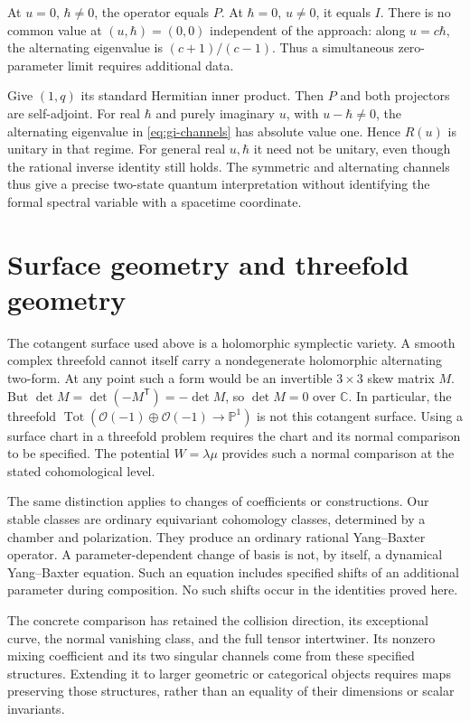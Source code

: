 At $u=0$, $\hbar\ne0$, the operator equals $P$.
At $\hbar=0$, $u\ne0$, it equals $I$.
There is no common value at $(u,\hbar)=(0,0)$ independent of the approach: along $u=c\hbar$, the alternating eigenvalue is $(c+1)/(c-1)$.
Thus a simultaneous zero-parameter limit requires additional data.

Give $(1,q)$ its standard Hermitian inner product.
Then $P$ and both projectors are self-adjoint.
For real $\hbar$ and purely imaginary $u$, with $u-\hbar\ne0$, the alternating eigenvalue in \eqref{eq:gi-channels} has absolute value one.
Hence $R(u)$ is unitary in that regime.
For general real $u,\hbar$ it need not be unitary, even though the rational inverse identity still holds.
The symmetric and alternating channels thus give a precise two-state quantum interpretation without identifying the formal spectral variable with a spacetime coordinate.

\section{Surface geometry and threefold geometry}

The cotangent surface used above is a holomorphic symplectic variety.
A smooth complex threefold cannot itself carry a nondegenerate holomorphic alternating two-form.
At any point such a form would be an invertible $3\times3$ skew matrix $M$.
But $\det M=\det(-M^{\mathsf T})=-\det M$, so $\det M=0$ over $\mathbb C$.
In particular, the threefold $\operatorname{Tot}(\mathcal O(-1)\oplus\mathcal O(-1)\to\mathbb P^1)$ is not this cotangent surface.
Using a surface chart in a threefold problem requires the chart and its normal comparison to be specified.
The potential $W=\lambda\mu$ provides such a normal comparison at the stated cohomological level.

The same distinction applies to changes of coefficients or constructions.
Our stable classes are ordinary equivariant cohomology classes, determined by a chamber and polarization.
They produce an ordinary rational Yang--Baxter operator.
A parameter-dependent change of basis is not, by itself, a dynamical Yang--Baxter equation.
Such an equation includes specified shifts of an additional parameter during composition.
No such shifts occur in the identities proved here.

The concrete comparison has retained the collision direction, its exceptional curve, the normal vanishing class, and the full tensor intertwiner.
Its nonzero mixing coefficient and its two singular channels come from these specified structures.
Extending it to larger geometric or categorical objects requires maps preserving those structures, rather than an equality of their dimensions or scalar invariants.
